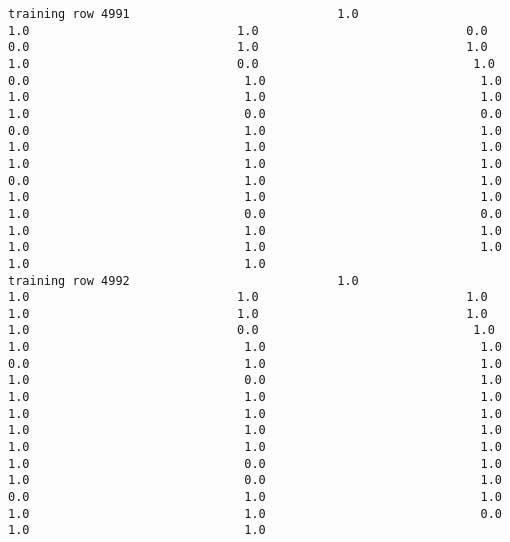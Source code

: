 \documentclass[11pt]{article}
\begin{document}
\begin{verbatim}
training row 4991                             1.0                             1.0                             1.0                             0.0                             0.0                             1.0                             1.0                             1.0                             0.0                              1.0                              0.0                              1.0                              1.0                              1.0                              1.0                              1.0                              1.0                              0.0                              0.0                              0.0                              1.0                              1.0                              1.0                              1.0                              1.0                              1.0                              1.0                              1.0                              0.0                              1.0                              1.0                              1.0                              1.0                              1.0                              1.0                              0.0                              0.0                              1.0                              1.0                              1.0                              1.0                              1.0                              1.0                              1.0                              1.0
training row 4992                             1.0                             1.0                             1.0                             1.0                             1.0                             1.0                             1.0                             1.0                             0.0                              1.0                              1.0                              1.0                              1.0                              0.0                              1.0                              1.0                              1.0                              0.0                              1.0                              1.0                              1.0                              1.0                              1.0                              1.0                              1.0                              1.0                              1.0                              1.0                              1.0                              1.0                              1.0                              1.0                              0.0                              1.0                              1.0                              0.0                              1.0                              0.0                              1.0                              1.0                              1.0                              1.0                              0.0                              1.0                              1.0

\end{verbatim}
\end{document}
